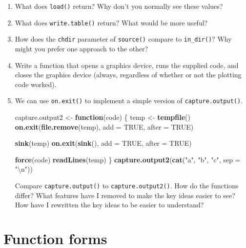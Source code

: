 \documentclass[]{book}
\newenvironment{Shaded}{\begin{snugshade}}{\end{snugshade}}
\newcommand{\CharTok}[1]{\textcolor[rgb]{0.31,0.60,0.02}{#1}}
\newcommand{\ControlFlowTok}[1]{\textcolor[rgb]{0.13,0.29,0.53}{\textbf{#1}}}
\newcommand{\DataTypeTok}[1]{\textcolor[rgb]{0.13,0.29,0.53}{#1}}
\newcommand{\KeywordTok}[1]{\textcolor[rgb]{0.13,0.29,0.53}{\textbf{#1}}}
\newcommand{\NormalTok}[1]{#1}
\newcommand{\OtherTok}[1]{\textcolor[rgb]{0.56,0.35,0.01}{#1}}
\newcommand{\StringTok}[1]{\textcolor[rgb]{0.31,0.60,0.02}{#1}}
\theoremstyle{definition}
\theoremstyle{definition}
\theoremstyle{definition}
\theoremstyle{remark}
\begin{document}
\begin{enumerate}
\def\labelenumi{\arabic{enumi}.}
\item
  What does \texttt{load()} return? Why don't you normally see these
  values?
\item
  What does \texttt{write.table()} return? What would be more useful?
\item
  How does the \texttt{chdir} parameter of \texttt{source()} compare to
  \texttt{in\_dir()}? Why might you prefer one approach to the other?
\item
  Write a function that opens a graphics device, runs the supplied code,
  and closes the graphics device (always, regardless of whether or not
  the plotting code worked).
\item
  We can use \texttt{on.exit()} to implement a simple version of
  \texttt{capture.output()}.

\begin{Shaded}
\begin{Highlighting}[]
\NormalTok{capture.output2 <-}\StringTok{ }\ControlFlowTok{function}\NormalTok{(code) \{}
\NormalTok{  temp <-}\StringTok{ }\KeywordTok{tempfile}\NormalTok{()}
  \KeywordTok{on.exit}\NormalTok{(}\KeywordTok{file.remove}\NormalTok{(temp), }\DataTypeTok{add =} \OtherTok{TRUE}\NormalTok{, }\DataTypeTok{after =} \OtherTok{TRUE}\NormalTok{)}

  \KeywordTok{sink}\NormalTok{(temp)}
  \KeywordTok{on.exit}\NormalTok{(}\KeywordTok{sink}\NormalTok{(), }\DataTypeTok{add =} \OtherTok{TRUE}\NormalTok{, }\DataTypeTok{after =} \OtherTok{TRUE}\NormalTok{)}

  \KeywordTok{force}\NormalTok{(code)}
  \KeywordTok{readLines}\NormalTok{(temp)}
\NormalTok{\}}
\KeywordTok{capture.output2}\NormalTok{(}\KeywordTok{cat}\NormalTok{(}\StringTok{"a"}\NormalTok{, }\StringTok{"b"}\NormalTok{, }\StringTok{"c"}\NormalTok{, }\DataTypeTok{sep =} \StringTok{"}\CharTok{\textbackslash{}n}\StringTok{"}\NormalTok{))}
\end{Highlighting}
\end{Shaded}

  Compare \texttt{capture.output()} to \texttt{capture.output2()}. How
  do the functions differ? What features have I removed to make the key
  ideas easier to see? How have I rewritten the key ideas to be easier
  to understand?
\end{enumerate}

\hypertarget{function-forms}{%
\section{Function forms}\label{function-forms}}
\end{document}
